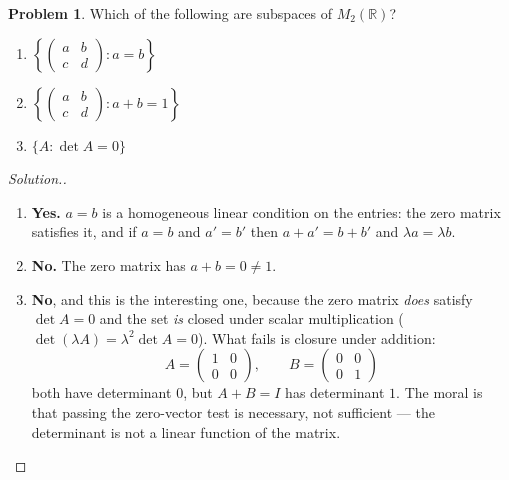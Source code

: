 \documentclass[11pt,a4paper]{article}
\theoremstyle{definition}
\newtheorem{problemx}{Problem}[section]
\newenvironment{problem}{\begin{problemx}}{\end{problemx}}
\newenvironment{solution}
  {\renewcommand{\qedsymbol}{}\begin{proof}[\textit{Solution}.]}
  {\end{proof}}
\begin{document}
\begin{problem}
Which of the following are subspaces of $M_2(\mathbb{R})$?
\begin{enumerate}
\item[(a)] $\left\{\begin{pmatrix}a&b\\c&d\end{pmatrix}:a=b\right\}$ \qquad
\item[(b)] $\left\{\begin{pmatrix}a&b\\c&d\end{pmatrix}:a+b=1\right\}$ \qquad
\item[(c)] $\{A:\det A=0\}$
\end{enumerate}
\end{problem}
\begin{solution}
\begin{enumerate}
\item[(a)] \textbf{Yes.} $a=b$ is a homogeneous linear condition on the
entries: the zero matrix satisfies it, and if $a=b$ and $a'=b'$ then
$a+a'=b+b'$ and $\lambda a=\lambda b$.

\item[(b)] \textbf{No.} The zero matrix has $a+b=0\neq 1$.

\item[(c)] \textbf{No}, and this is the interesting one, because the zero
matrix \emph{does} satisfy $\det A=0$ and the set \emph{is} closed under scalar
multiplication ($\det(\lambda A)=\lambda^2\det A=0$). What fails is closure
under addition:
$$A=\begin{pmatrix}1&0\\0&0\end{pmatrix},\qquad
  B=\begin{pmatrix}0&0\\0&1\end{pmatrix}$$
both have determinant $0$, but $A+B=I$ has determinant $1$. The moral is that
passing the zero-vector test is necessary, not sufficient --- the determinant
is not a linear function of the matrix.
\end{enumerate}
\end{solution}
\end{document}
